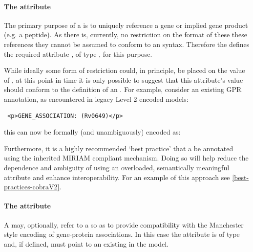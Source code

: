 \paragraph{The  attribute}
The primary purpose of a \GeneProduct is to uniquely reference a gene or
implied gene product (e.g. a peptide). As there is, currently, no
restriction on the format of these these references they cannot be
assumed to conform to an \SBML {} syntax. Therefore the \FBCPackage
defines the required attribute , of type ,
for this purpose.

While ideally some form of restriction could, in principle, be placed on the value of , at this point in time it is only possible to suggest that this attribute's value should conform to the definition of an
. For example, consider an existing GPR annotation, as encountered in legacy \SBML Level 2 encoded models:
\begin{verbatim}
 <p>GENE_ASSOCIATION: (Rv0649)</p>
\end{verbatim}
%
this can now be formally (and unambiguously) encoded as:
%

Furthermore, it is a highly recommended `best practice' that a \GeneProduct be annotated using the inherited MIRIAM compliant \SBML \Annotation mechanism. Doing so will help reduce the dependence and ambiguity of using an overloaded, semantically meaningful  attribute and enhance interoperability. For an example of this approach see \ref{best-practices-cobraV2}.

\paragraph{The  attribute}
A \GeneProduct may, optionally, refer to a \Species so as to provide compatibility with the Manchester style encoding of gene-protein associations. In this case the attribute  is of type  and, if defined, must point to an existing \Species in the model.

